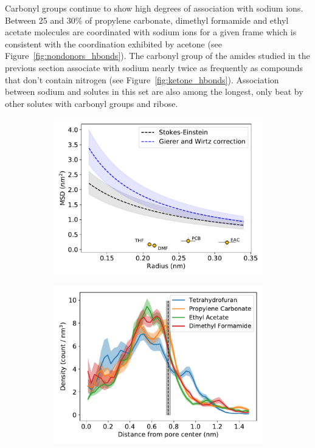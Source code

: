 \documentclass[journal=jpcbfk,manuscript=article]{achemso}
\begin{document}
  Carbonyl groups continue to show high degrees of association with
  sodium ions. Between 25 and 30\% of propylene carbonate, dimethyl 
  formamide and ethyl acetate molecules are coordinated with sodium ions
  for a given frame which is consistent with the coordination exhibited by acetone
  (see Figure~\ref{fig:nondonors_hbonds}). The carbonyl group of the amides 
  studied in the previous section associate with sodium nearly twice as 
  frequently as compounds that don't contain nitrogen 
  (see Figure~\ref{fig:ketone_hbonds}).
  Association between sodium and solutes in this set are also among the longest,
  only beat by other solutes with carbonyl groups and ribose.
 
  \begin{figure}[!htb]
  \centering
  \begin{subfigure}{0.325\textwidth}
  \includegraphics[width=\textwidth]{msd_radius_nondonors_10wt.pdf}
  \caption{}\label{fig:nondonors_rdf}
  \end{subfigure}
  \begin{subfigure}{0.325\textwidth}
  \includegraphics[width=\textwidth]{nondonors_rdf.pdf}

\end{subfigure}
\end{figure}
\end{document}
